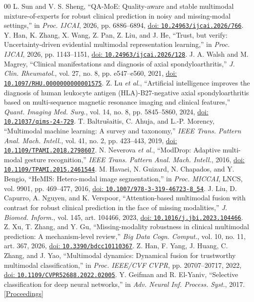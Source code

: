 \documentclass[conference]{IEEEtran}
\newcommand{\doi}[1]{\href{https://doi.org/#1}{doi: \nolinkurl{#1}}}
\begin{document}
\begin{thebibliography}{00}
 L. Sun and V. S. Sheng, ``QA-MoE: Quality-aware and stable multimodal mixture-of-experts for robust clinical prediction in noisy and missing-modal settings,'' in \emph{Proc. IJCAI}, 2026, pp. 6886--6894, \doi{10.24963/ijcai.2026/766}.
 Y. Han, K. Zhang, X. Wang, Z. Pan, Z. Liu, and J. He, ``Trust, but verify: Uncertainty-driven evidential multimodal representation learning,'' in \emph{Proc. IJCAI}, 2026, pp. 1143--1151, \doi{10.24963/ijcai.2026/128}.
 J. A. Walsh and M. Magrey, ``Clinical manifestations and diagnosis of axial spondyloarthritis,'' \emph{J. Clin. Rheumatol.}, vol. 27, no. 8, pp. e547--e560, 2021, \doi{10.1097/RHU.0000000000001575}.
 Z. Lu \emph{et al.}, ``Artificial intelligence improves the diagnosis of human leukocyte antigen (HLA)-B27-negative axial spondyloarthritis based on multi-sequence magnetic resonance imaging and clinical features,'' \emph{Quant. Imaging Med. Surg.}, vol. 14, no. 8, pp. 5845--5860, 2024, \doi{10.21037/qims-24-729}.
 T. Baltru\v{s}aitis, C. Ahuja, and L.-P. Morency, ``Multimodal machine learning: A survey and taxonomy,'' \emph{IEEE Trans. Pattern Anal. Mach. Intell.}, vol. 41, no. 2, pp. 423--443, 2019, \doi{10.1109/TPAMI.2018.2798607}.
 N. Neverova \emph{et al.}, ``ModDrop: Adaptive multi-modal gesture recognition,'' \emph{IEEE Trans. Pattern Anal. Mach. Intell.}, 2016, \doi{10.1109/TPAMI.2015.2461544}.
 M. Havaei, N. Guizard, N. Chapados, and Y. Bengio, ``HeMIS: Hetero-modal image segmentation,'' in \emph{Proc. MICCAI}, LNCS, vol. 9901, pp. 469--477, 2016, \doi{10.1007/978-3-319-46723-8_54}.
 J. Liu, D. Capurro, A. Nguyen, and K. Verspoor, ``Attention-based multimodal fusion with contrast for robust clinical prediction in the face of missing modalities,'' \emph{J. Biomed. Inform.}, vol. 145, art. 104466, 2023, \doi{10.1016/j.jbi.2023.104466}.
 Z. Xu, T. Zhang, and Y. Gu, ``Missing-modality robustness in clinical multimodal prediction: A mechanism-level review,'' \emph{Big Data Cogn. Comput.}, vol. 10, no. 11, art. 367, 2026, \doi{10.3390/bdcc10110367}.
 Z. Han, F. Yang, J. Huang, C. Zhang, and J. Yao, ``Multimodal dynamics: Dynamical fusion for trustworthy multimodal classification,'' in \emph{Proc. IEEE/CVF CVPR}, pp. 20707--20717, 2022, \doi{10.1109/CVPR52688.2022.02005}.
 Y. Geifman and R. El-Yaniv, ``Selective classification for deep neural networks,'' in \emph{Adv. Neural Inf. Process. Syst.}, 2017. \href{https://proceedings.neurips.cc/paper/2017/hash/4a8423d5e91fda00bb7e46540e2b0cf1-Abstract.html}{[Proceedings]}

\end{thebibliography}
\end{document}
